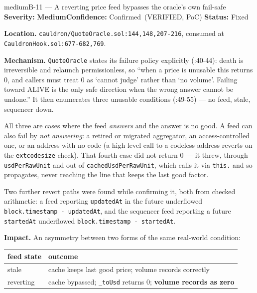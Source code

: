 \documentclass[11pt,a4paper]{article}
\newcommand{\SevMed}{\textcolor{medium}{\textbf{Medium}}}
\newcommand{\Conf}{\textcolor{critical}{Confirmed}}
\newcommand{\Fixed}{\textcolor{good}{Fixed}}
\newcommand{\code}[1]{\texttt{\small #1}}
\newcommand{\fileref}[1]{\texttt{\scriptsize #1}}
\begin{document}
\begin{findingbox}{medium}{B-11 --- A reverting price feed bypasses the oracle's own fail-safe}
\textbf{Severity:} \SevMed \quad \textbf{Confidence:} \Conf\ (VERIFIED, PoC) \quad
\textbf{Status:} \Fixed

\medskip
\textbf{Location.} \fileref{cauldron/QuoteOracle.sol:144,148,207-216}, consumed at
\fileref{CauldronHook.sol:677-682,769}.

\textbf{Mechanism.} \code{QuoteOracle} states its failure policy explicitly (:40-44):
death is irreversible and relaunch permissionless, so ``when a price is unusable this
returns 0, and callers must treat 0 as `cannot judge' rather than `no volume'. Failing
toward ALIVE is the only safe direction when the wrong answer cannot be undone.'' It then
enumerates three unusable conditions (:49-55) --- no feed, stale, sequencer down.

All three are cases where the feed \emph{answers} and the answer is no good. A feed can
also fail by \emph{not answering}: a retired or migrated aggregator, an access-controlled
one, or an address with no code (a high-level call to a codeless address reverts on the
\code{extcodesize} check). That fourth case did not return 0 --- it threw, through
\code{usdPerRawUnit} and out of \code{cachedUsdPerRawUnit}, which calls it via
\code{this.} and so propagates, never reaching the line that keeps the last good factor.

Two further revert paths were found while confirming it, both from checked arithmetic: a
feed reporting \code{updatedAt} in the future underflowed
\code{block.timestamp - updatedAt}, and the sequencer feed reporting a future
\code{startedAt} underflowed \code{block.timestamp - startedAt}.

\textbf{Impact.} An asymmetry between two forms of the same real-world condition:

\begin{center}\small
\begin{tabular}{@{}ll@{}}
\toprule
\textbf{feed state} & \textbf{outcome} \\
\midrule
stale & cache keeps last good price; volume records correctly \\
reverting & cache bypassed; \code{\_toUsd} returns 0; \textbf{volume records as zero} \\
\bottomrule
\end{tabular}
\end{center}


\end{findingbox}
\end{document}
